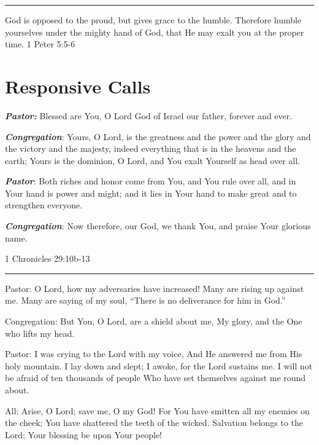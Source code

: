 \documentclass[]{book}
\begin{document}
\begin{center}\rule{0.5\linewidth}{\linethickness}\end{center}

God is opposed to the proud, but gives grace to the humble. Therefore
humble yourselves under the mighty hand of God, that He may exalt you at
the proper time. \textbar{} 1 Peter 5:5-6

\hypertarget{responsive-calls}{\section*{Responsive
Calls}\label{responsive-calls}}

\textbf{\emph{Pastor:}} Blessed are You, O Lord God of Israel our
father, forever and ever.

\textbf{\emph{Congregation}}: Yours, O Lord, is the greatness and the
power and the glory and the victory and the majesty, indeed everything
that is in the heavens and the earth; Yours is the dominion, O Lord, and
You exalt Yourself as head over all.

\textbf{\emph{Pastor}}: Both riches and honor come from You, and You
rule over all, and in Your hand is power and might; and it lies in Your
hand to make great and to strengthen everyone.

\textbf{\emph{Congregation}}: Now therefore, our God, we thank You, and
praise Your glorious name.

\textbar{} 1 Chronicles 29:10b-13 \textbar{}

\begin{center}\rule{0.5\linewidth}{\linethickness}\end{center}

Pastor: O Lord, how my adversaries have increased! Many are rising up
against me. Many are saying of my soul, ``There is no deliverance for
him in God.''

Congregation: But You, O Lord, are a shield about me, My glory, and the
One who lifts my head.

Pastor: I was crying to the Lord with my voice, And He answered me from
His holy mountain. I lay down and slept; I awoke, for the Lord sustains
me. I will not be afraid of ten thousands of people Who have set
themselves against me round about.

All: Arise, O Lord; save me, O my God! For You have smitten all my
enemies on the cheek; You have shattered the teeth of the wicked.
Salvation belongs to the Lord; Your blessing be upon Your people!
\end{document}

